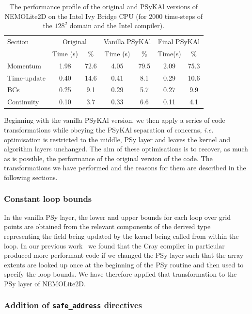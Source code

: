 \documentclass[gmdd, manuscript]{copernicus}
\begin{document}
\begin{table}[!t]
\caption{The performance profile of the original and {PS}y{KA}l versions
  of NEMOLite2D on the Intel Ivy Bridge CPU (for 2000 time-steps of the
  $128^{2}$ domain and the Intel compiler).}
\label{TABLE_profile}
\centering
\begin{tabular}{l|c|c|c|c|c|c}
\hline
Section & \multicolumn{2}{c|}{Original} & \multicolumn{2}{c|}{Vanilla {PS}y{KA}l} &
\multicolumn{2}{c}{Final {PS}y{KA}l} \\
        & Time (s) & \%  & Time (s) & \%  & Time(s) & \% \\
\hline
Momentum    & 1.98  & 72.6  & 4.05  & 79.5 & 2.09 & 75.3 \\
Time-update & 0.40  & 14.6  & 0.41  & 8.1  & 0.29 & 10.6 \\
BCs         & 0.25  & 9.1   & 0.29  & 5.7  & 0.27 & 9.9  \\
Continuity  & 0.10  & 3.7   & 0.33  & 6.6  & 0.11 & 4.1  \\
\hline
\end{tabular}
\end{table}

Beginning with the vanilla {PS}y{KA}l version, we then apply a series of
code transformations while obeying the {PS}y{KA}l separation of concerns,
\textit{i.e.} optimisation is restricted to the middle, {PS}y layer and
leaves the kernel and algorithm layers unchanged. The aim of these
optimisations is to recover, as much as is possible, the performance
of the original version of the code. The transformations we have
performed and the reasons for them are described in the following sections.

\subsubsection{Constant loop bounds}

In the vanilla {PS}y layer, the lower and upper bounds for each loop
over grid points are obtained from the relevant components of the
derived type representing the field being updated by the kernel being
called from within the loop. In our previous
work~\citep{shallow_psykal} we found that the Cray compiler in
particular produced more performant code if we changed the PSy layer
such that the array extents are looked up once at the beginning of the
PSy routine and then used to specify the loop bounds. We have therefore
applied that transformation to the PSy layer of NEMOLite2D.

\subsubsection{Addition of \texttt{safe\_address} directives}
\label{sec_safe_address}
\end{document}
